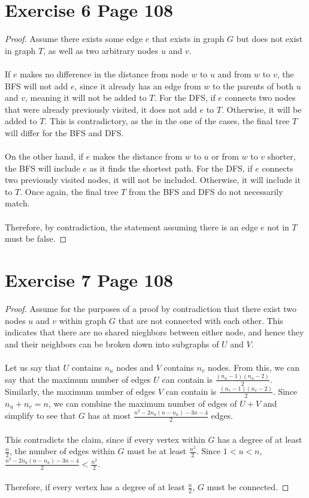 \documentclass[11pt]{article}
\begin{document}
\section*{Exercise 6 Page 108}
\begin{proof}
Assume there exists some edge $e$ that exists in graph $G$ but does not exist in graph $T$, as well as two arbitrary nodes $u$ and $v$. \\ \\
If $e$ makes no difference in the distance from node $w$ to $u$ and from $w$ to $v$, the BFS will not add $e$, since it already has an edge from $w$ to the parents of both $u$ and $v$, meaning it will not be added to $T$. For the DFS, if $e$ connects two nodes that were already previously visited, it does not add $e$ to $T$. Otherwise, it will be added to $T$. This is contradictory, as the in the one of the cases, the final tree $T$ will differ for the BFS and DFS. \\ \\
On the other hand, if $e$ makes the distance from $w$ to $u$ or from $w$ to $v$ shorter, the BFS will include $e$ as it finds the shortest path. For the DFS, if $e$ connects two previously visited nodes, it will not be included. Otherwise, it will include it to $T$. Once again, the final tree $T$ from the BFS and DFS do not necessarily match. \\ \\
Therefore, by contradiction, the statement assuming there is an edge $e$ not in $T$ must be false.
\end{proof}
\newpage

\section*{Exercise 7 Page 108}
\begin{proof}
Assume for the purposes of a proof by contradiction that there exist two nodes $u$ and $v$ within graph $G$ that are not connected with each other. This indicates that there are no shared nieghbors between either node, and hence they and their neighbors can be broken down into subgraphs of $U$ and $V$. \\ \\
Let us say that $U$ contains $n_u$ nodes and $V$ contains $n_v$ nodes. From this, we can say that the maximum number of edges $U$ can contain is $\frac{(n_u -1)(n_u - 2)}{2}$. Similarly, the maximum number of edges $V$ can contain is $\frac{(n_v -1)(n_v - 2)}{2}$. Since $n_u + n_v = n$, we can combine the maximum number of edges of $U + V$ and simplify to see that $G$ has at most $\frac{n^2-2n_u(n-n_u)-3n-4}{2}$ edges. \\ \\
This contradicts the claim, since if every vertex within $G$ has a degree of at least $\frac{n}{2}$, the number of edges within $G$ must be at least $\frac{n^2}{2}$. Since $1 < u < n$, $\frac{n^2-2n_u(n-n_u)-3n-4}{2} < \frac{n^2}{2}$. \\ \\
Therefore, if every vertex has a degree of at least $\frac{n}{2}$, $G$ must be connected.
\end{proof}
\newpage
\end{document}
